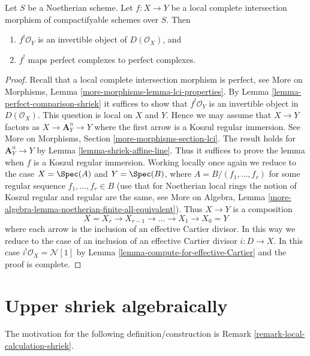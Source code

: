 \begin{lemma}
\label{lemma-lci-shriek}
Let $S$ be a Noetherian scheme. Let $f : X \to Y$ be a local complete
intersection morphism of compactifyable schemes over $S$. Then
\begin{enumerate}
\item $f^!\mathcal{O}_Y$ is an invertible object of $D(\mathcal{O}_X)$, and
\item $f^!$ maps perfect complexes to perfect complexes.
\end{enumerate}
\end{lemma}

\begin{proof}
Recall that a local complete intersection morphism is perfect, see
More on Morphisms, Lemma \ref{more-morphisms-lemma-lci-properties}.
By Lemma \ref{lemma-perfect-comparison-shriek} it suffices to show
that $f^!\mathcal{O}_Y$ is an invertible object in $D(\mathcal{O}_X)$.
This question is local on $X$ and $Y$. Hence we may assume that $X \to Y$
factors as $X \to \mathbf{A}^n_Y \to Y$ where the first arrow is a
Koszul regular immersion. See More on Morphisms, Section
\ref{more-morphisms-section-lci}.
The result holds for $\mathbf{A}^n_Y \to Y$
by Lemma \ref{lemma-shriek-affine-line}. Thus it suffices to prove
the lemma when $f$ is a Koszul regular immersion.
Working locally once again we reduce to the case
$X = \Spec(A)$ and $Y = \Spec(B)$, where $A = B/(f_1, \ldots, f_r)$
for some regular sequence $f_1, \ldots, f_r \in B$
(use that for Noetherian local rings the notion of Koszul
regular and regular are the same, see
More on Algebra, Lemma
\ref{more-algebra-lemma-noetherian-finite-all-equivalent}).
Thus $X \to Y$ is a composition
$$
X = X_r \to X_{r - 1} \to \ldots \to X_1 \to X_0 = Y
$$
where each arrow is the inclusion of an effective Cartier divisor.
In this way we reduce to the case of an inclusion of an effective
Cartier divisor $i : D \to X$. In this case
$i^!\mathcal{O}_X = \mathcal{N}[1]$ by
Lemma \ref{lemma-compute-for-effective-Cartier} and the proof is complete.
\end{proof}






\section{Upper shriek algebraically}
\label{section-relative-dualizing-complex-algebraic}

\noindent
The motivation for the following definition/construction is
Remark \ref{remark-local-calculation-shriek}.


